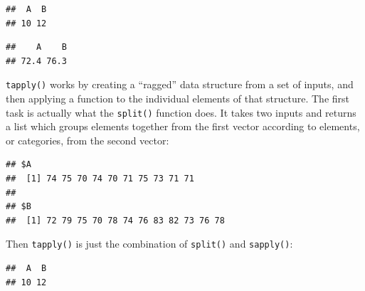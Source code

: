 \begin{verbatim}
##  A  B 
## 10 12
\end{verbatim}

\begin{Shaded}
\begin{Highlighting}[]
\end{Highlighting}
\end{Shaded}

\begin{verbatim}
##    A    B 
## 72.4 76.3
\end{verbatim}

\texttt{tapply()} works by creating a ``ragged'' data structure from a
set of inputs, and then applying a function to the individual elements
of that structure. The first task is actually what the \texttt{split()}
function does. It takes two inputs and returns a list which groups
elements together from the first vector according to elements, or
categories, from the second vector:

\begin{Shaded}
\begin{Highlighting}[]
\end{Highlighting}
\end{Shaded}

\begin{verbatim}
## $A
##  [1] 74 75 70 74 70 71 75 73 71 71
## 
## $B
##  [1] 72 79 75 70 78 74 76 83 82 73 76 78
\end{verbatim}

Then \texttt{tapply()} is just the combination of \texttt{split()} and
\texttt{sapply()}:

\begin{Shaded}
\begin{Highlighting}[]
\StringTok{ } \NormalTok{) \{}
\StringTok{ }
\NormalTok{\}}
\end{Highlighting}
\end{Shaded}

\begin{verbatim}
##  A  B 
## 10 12
\end{verbatim}


